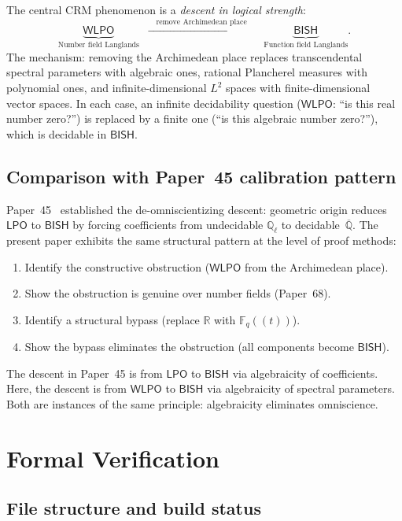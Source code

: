 \documentclass[11pt]{article}
\theoremstyle{plain}
\theoremstyle{definition}
\theoremstyle{remark}
\newcommand{\Q}{\mathbb{Q}}
\newcommand{\R}{\mathbb{R}}
\newcommand{\Fq}{\mathbb{F}_q}
\newcommand{\Qell}{\Q_\ell}
\newcommand{\CRM}{\mathrm{CRM}}
\newcommand{\BISH}{\mathsf{BISH}}
\newcommand{\LPO}{\mathsf{LPO}}
\newcommand{\WLPO}{\mathsf{WLPO}}
\begin{document}
The central $\CRM$ phenomenon is a \emph{descent in logical strength}:
\[
\underbrace{\WLPO}_{\text{Number field Langlands}} \;\;\xrightarrow{\quad\text{remove Archimedean place}\quad}\;\; \underbrace{\BISH}_{\text{Function field Langlands}}.
\]
The mechanism: removing the Archimedean place replaces transcendental spectral
parameters with algebraic ones, rational Plancherel measures with polynomial
ones, and infinite-dimensional $L^2$ spaces with finite-dimensional vector
spaces. In each case, an infinite decidability question ($\WLPO$: ``is this
real number zero?'') is replaced by a finite one (``is this algebraic number
zero?''), which is decidable in $\BISH$.

\subsection{Comparison with Paper~45 calibration pattern}

Paper~45~\cite{Paper45} established the de-omniscientizing descent: geometric
origin reduces $\LPO$ to $\BISH$ by forcing coefficients from undecidable
$\Qell$ to decidable~$\overline{\Q}$. The present paper exhibits the same
structural pattern at the level of proof methods:
\begin{enumerate}
\item Identify the constructive obstruction ($\WLPO$ from the Archimedean place).
\item Show the obstruction is genuine over number fields (Paper~68).
\item Identify a structural bypass (replace $\R$ with $\Fq((t))$).
\item Show the bypass eliminates the obstruction (all components become $\BISH$).
\end{enumerate}
The descent in Paper~45 is from $\LPO$ to $\BISH$ via algebraicity of
coefficients. Here, the descent is from $\WLPO$ to $\BISH$ via algebraicity
of spectral parameters. Both are instances of the same principle: algebraicity
eliminates omniscience.

\section{Formal Verification}\label{sec:formal}

\subsection{File structure and build status}
\end{document}
